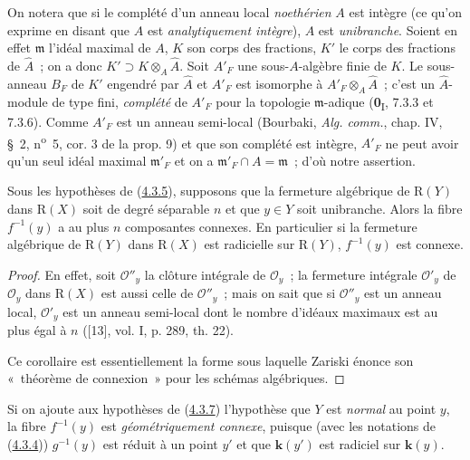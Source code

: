 On notera que si le complété d'un anneau local \emph{noethérien} $A$ est intègre
(ce qu'on exprime en disant que $A$ est \emph{analytiquement intègre}), $A$
est \emph{unibranche}. Soient en effet $\mathfrak m$ l'idéal maximal de $A$, $K$
son corps des fractions, $K'$ le corps des fractions de $\widehat A$~; on
a donc
$K'\supset K\otimes_A\widehat A$.
Soit $A'_F$ une sous-$A$-algèbre finie de $K$. Le sous-anneau $B_F$ de $K'$
engendré par $\widehat A$ et $A'_F$ est isomorphe à
$A'_F\otimes_A\widehat A$~; c'est un $\widehat A$-module de type fini,
\emph{complété} de $A'_F$ pour la topologie $\mathfrak m$-adique
(\textbf{0}\textsubscript{I}, 7.3.3 et 7.3.6). Comme $A'_F$ est un anneau semi-local
(Bourbaki, \emph{Alg. comm.}, chap. IV, \S~2, n\textsuperscript{o}~5,
cor. 3 de la prop. 9) et que son complété est intègre, $A'_F$ ne peut avoir
qu'un seul idéal maximal $\mathfrak m'_F$ et on a
$\mathfrak m'_F\cap A=\mathfrak m$~; d'où notre assertion.

\begin{corollary}[4.3.7]
\label{III.4.3.7-fr}
Sous les hypothèses de \textup{(\hyperref[III.4.3.5-fr]{4.3.5})}, supposons que la
fermeture algébrique de $\mathrm R(Y)$ dans $\mathrm R(X)$ soit de degré
séparable $n$ et que $y\in Y$ soit unibranche. Alors la fibre $f^{-1}(y)$ a
au plus $n$ composantes connexes. En particulier si la fermeture algébrique
de $\mathrm R(Y)$ dans $\mathrm R(X)$ est radicielle sur $\mathrm R(Y)$,
$f^{-1}(y)$ est connexe.
\end{corollary}

\begin{proof}
En effet, soit $\mathcal O''_y$ la clôture intégrale de $\mathcal O_y$~; la
fermeture intégrale $\mathcal O'_y$ de $\mathcal O_y$ dans $\mathrm R(X)$
est aussi celle de $\mathcal O''_y$~; mais on sait que si $\mathcal O''_y$ est
un anneau local, $\mathcal O'_y$ est un anneau semi-local dont le nombre
d'idéaux maximaux est au plus égal à $n$ ([13], vol. I, p. 289, th. 22).

Ce corollaire est essentiellement la forme sous laquelle Zariski énonce son
«~théorème de connexion~» pour les schémas algébriques.
\end{proof}

\begin{remark}[4.3.8]
\label{III.4.3.8-fr}
Si on ajoute aux hypothèses de (\hyperref[III.4.3.7-fr]{4.3.7}) l'hypothèse
que $Y$ est \emph{normal} au point $y$, la fibre $f^{-1}(y)$ est
\emph{géométriquement connexe}, puisque (avec les notations de
(\hyperref[III.4.3.4-fr]{4.3.4})) $g^{-1}(y)$ est réduit à un point $y'$ et
que $\boldsymbol{k}(y')$ est radiciel sur $\boldsymbol{k}(y)$.
\end{remark}

